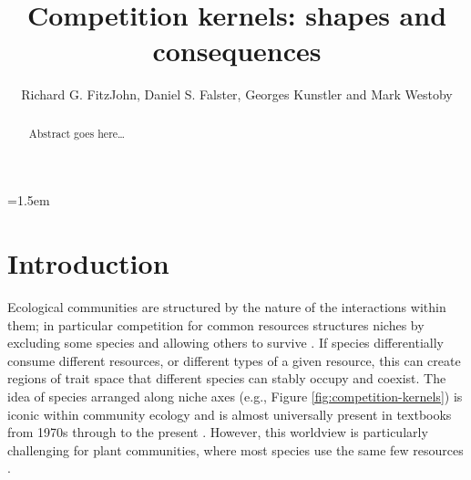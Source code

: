 \documentclass[a4paper,11pt]{article}
\title{Competition kernels: shapes and consequences}
\author{Richard G. FitzJohn, Daniel S. Falster, Georges Kunstler and Mark Westoby}
\date{}
\affiliation{Department of Biological Sciences, Macquarie University,
  Sydney, Australia}
\begin{document}

\mstitlepage
\parindent=1.5em
\addtolength{\parskip}{.3em}

\begin{abstract}
Abstract goes here\ldots
\end{abstract}

\section{Introduction}

%
Ecological communities are structured by the nature of the
interactions within them;
in particular competition for common resources structures niches by
excluding some species and allowing others to survive
\citep[e.g.][]{Gause-1934,Lack-1947,MacArthur-1967}.
%
If species differentially consume different resources, or different
types of a given resource, this can create regions of trait space that
different species can stably occupy and coexist.
%
The idea of species arranged along niche axes (e.g., Figure
\ref{fig:competition-kernels}) is iconic within community ecology and
is almost universally present in textbooks from 1970s through to the
present \citep[e.g.,][]{Krebs-1972, Ricklefs-1973, Ricklefs-1999,
  Krebs-2013}.
%
However, this worldview is particularly challenging for plant
communities, where most species use the same few resources
\citep[e.g.,][]{Whittaker-1970, Grime-1979, Hubbell-2001,
  Westoby-2002}.
\end{document}
